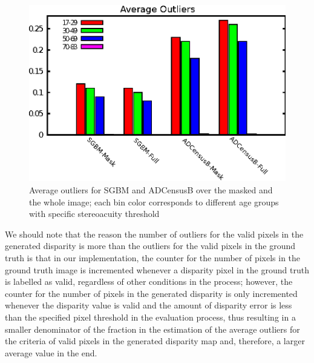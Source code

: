 \begin{figure}[H]
\centering
\includegraphics[scale=0.95]{outlchart}
\caption{Average outliers for SGBM and ADCensusB over the masked and the whole image; each bin color corresponds to different age groups with specific stereoacuity threshold}
\label{fig:outlbar}
\end{figure} 

We should note that the reason the number of outliers for the valid pixels in the generated disparity is more than the outliers for the valid pixels
in the ground truth is that in our implementation, the counter for the number of pixels in the ground truth image 
is incremented whenever a disparity pixel in the ground truth is labelled as valid, regardless of other conditions in the process; 
however, the counter for the number of pixels in the generated disparity
is only incremented whenever the disparity value is valid and the amount of disparity error is less than the specified pixel threshold in the evaluation process, thus resulting
in a smaller denominator of the fraction in the estimation of the average outliers for the criteria of valid pixels in the generated disparity map and, therefore, a larger 
average value in the end.

